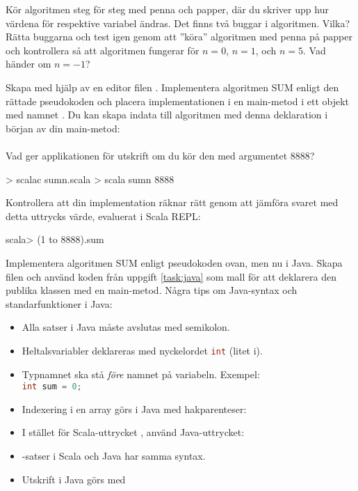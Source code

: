 \Subtask Kör algoritmen steg för steg med penna och papper, där du skriver upp hur värdena för respektive variabel ändras. Det finns två buggar i algoritmen. Vilka? Rätta buggarna och test igen genom att ''köra'' algoritmen med penna på papper och kontrollera så att algoritmen fungerar för $n=0$, $n=1$, och $n=5$. Vad händer om $n=-1$?

\Subtask Skapa med hjälp av en editor filen . Implementera algoritmen SUM enligt den rättade pseudokoden och placera implementationen i en main-metod i ett objekt med namnet . Du kan skapa indata  till algoritmen med denna deklaration i början av din main-metod: \\  \\ Vad ger applikationen för utskrift om du kör den med argumentet 8888?

\begin{REPLnonum}
> scalac sumn.scala
> scala sumn 8888
\end{REPLnonum}

\noindent Kontrollera att din implementation räknar rätt genom att jämföra svaret med detta uttrycks värde, evaluerat i Scala REPL:
\begin{REPLnonum}
scala> (1 to 8888).sum
\end{REPLnonum}

\Subtask Implementera algoritmen SUM enligt pseudokoden ovan, men nu i Java. Skapa filen  och använd koden från uppgift \ref{task:java} som mall för att deklarera den publika klassen  med en main-metod. Några tips om Java-syntax och standarfunktioner i Java:

\begin{itemize}[noitemsep, nolistsep]
\item Alla satser i Java måste avslutas med semikolon.
\item Heltalsvariabler deklareras med nyckelordet \lstinline[language=Java]{int} (litet i).
\item Typnamnet ska stå \emph{före} namnet på variabeln. Exempel: \\ \lstinline[language=Java]{int sum = 0;}
\item Indexering i en array görs i Java med hakparenteser: 
\item I stället för Scala-uttrycket , använd Java-uttrycket: \\ 
\item {}-satser i Scala och Java har samma syntax.
\item Utskrift i Java görs med 
\end{itemize}



